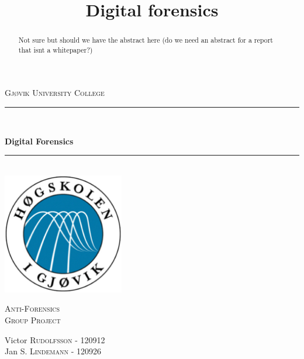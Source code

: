 

\title{Digital forensics}



\begin{titlepage}

\newcommand{\HRule}{\rule{\linewidth}{0.5mm}} %

\center %
\begin{myfont}
\textsc{{\large Gjøvik University College}}\\[0.5cm] %
\end{myfont}
\HRule \\[0.4cm]

\begin{myfont}
{ \huge \bfseries Digital Forensics}\\[0cm] %
\end{myfont}

\HRule \\[0.4cm]
\includegraphics[width=200px, height=200px]{logo}\\[0.8cm] %
\begin{myfont}
\textsc{\Large Anti-Forensics}\\[0.5cm] %
\textsc{\large Group Project}\\[0.5cm] %
\end{myfont}


\begin{minipage}{0.44\textwidth}
\begin{flushleft} \large
\begin{myfont}
Victor \textsc{Rudolfsson} - 120912\\ %
Jan  \textsc{S. Lindemann} - 120926\\ %
\end{myfont}
\end{flushleft}
\end{minipage}
\vspace*{2cm}
\begin{abstract}
 Not sure but should we have the abstract here (do we need an abstract for a report that isnt a whitepaper?)
\end{abstract}


\end{titlepage}
